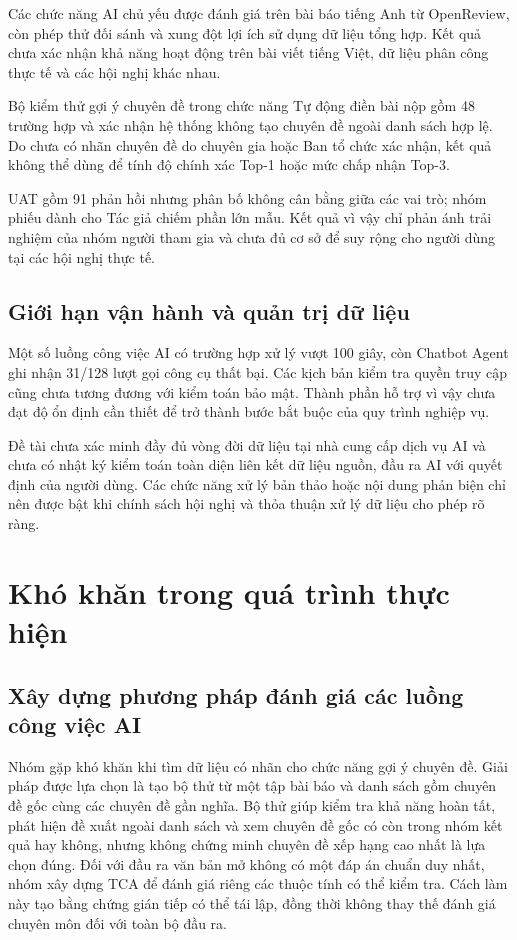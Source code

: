 Các chức năng AI chủ yếu được đánh giá trên bài báo tiếng Anh từ OpenReview, còn phép thử đối sánh và xung đột lợi ích sử dụng dữ liệu tổng hợp. Kết quả chưa xác nhận khả năng hoạt động trên bài viết tiếng Việt, dữ liệu phân công thực tế và các hội nghị khác nhau.

Bộ kiểm thử gợi ý chuyên đề trong chức năng Tự động điền bài nộp gồm 48 trường hợp và xác nhận hệ thống không tạo chuyên đề ngoài danh sách hợp lệ. Do chưa có nhãn chuyên đề do chuyên gia hoặc Ban tổ chức xác nhận, kết quả không thể dùng để tính độ chính xác Top-1 hoặc mức chấp nhận Top-3.

UAT gồm 91 phản hồi nhưng phân bố không cân bằng giữa các vai trò; nhóm phiếu dành cho Tác giả chiếm phần lớn mẫu. Kết quả vì vậy chỉ phản ánh trải nghiệm của nhóm người tham gia và chưa đủ cơ sở để suy rộng cho người dùng tại các hội nghị thực tế.

\subsection{Giới hạn vận hành và quản trị dữ liệu}

Một số luồng công việc AI có trường hợp xử lý vượt 100 giây, còn Chatbot Agent ghi nhận 31/128 lượt gọi công cụ thất bại. Các kịch bản kiểm tra quyền truy cập cũng chưa tương đương với kiểm toán bảo mật. Thành phần hỗ trợ vì vậy chưa đạt độ ổn định cần thiết để trở thành bước bắt buộc của quy trình nghiệp vụ.

Đề tài chưa xác minh đầy đủ vòng đời dữ liệu tại nhà cung cấp dịch vụ AI và chưa có nhật ký kiểm toán toàn diện liên kết dữ liệu nguồn, đầu ra AI với quyết định của người dùng. Các chức năng xử lý bản thảo hoặc nội dung phản biện chỉ nên được bật khi chính sách hội nghị và thỏa thuận xử lý dữ liệu cho phép rõ ràng.

\section{Khó khăn trong quá trình thực hiện}

\subsection{Xây dựng phương pháp đánh giá các luồng công việc AI}

Nhóm gặp khó khăn khi tìm dữ liệu có nhãn cho chức năng gợi ý chuyên đề. Giải pháp được lựa chọn là tạo bộ thử từ một tập bài báo và danh sách gồm chuyên đề gốc cùng các chuyên đề gần nghĩa. Bộ thử giúp kiểm tra khả năng hoàn tất, phát hiện đề xuất ngoài danh sách và xem chuyên đề gốc có còn trong nhóm kết quả hay không, nhưng không chứng minh chuyên đề xếp hạng cao nhất là lựa chọn đúng. Đối với đầu ra văn bản mở không có một đáp án chuẩn duy nhất, nhóm xây dựng TCA để đánh giá riêng các thuộc tính có thể kiểm tra. Cách làm này tạo bằng chứng gián tiếp có thể tái lập, đồng thời không thay thế đánh giá chuyên môn đối với toàn bộ đầu ra.

